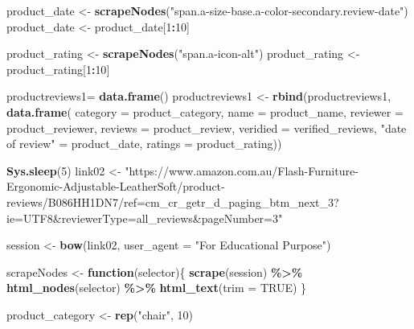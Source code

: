 \documentclass[
]{article}
\newenvironment{Shaded}{\begin{snugshade}}{\end{snugshade}}
\newcommand{\AttributeTok}[1]{\textcolor[rgb]{0.13,0.29,0.53}{#1}}
\newcommand{\ConstantTok}[1]{\textcolor[rgb]{0.56,0.35,0.01}{#1}}
\newcommand{\ControlFlowTok}[1]{\textcolor[rgb]{0.13,0.29,0.53}{\textbf{#1}}}
\newcommand{\DecValTok}[1]{\textcolor[rgb]{0.00,0.00,0.81}{#1}}
\newcommand{\FunctionTok}[1]{\textcolor[rgb]{0.13,0.29,0.53}{\textbf{#1}}}
\newcommand{\NormalTok}[1]{#1}
\newcommand{\OtherTok}[1]{\textcolor[rgb]{0.56,0.35,0.01}{#1}}
\newcommand{\SpecialCharTok}[1]{\textcolor[rgb]{0.81,0.36,0.00}{\textbf{#1}}}
\newcommand{\StringTok}[1]{\textcolor[rgb]{0.31,0.60,0.02}{#1}}
\begin{document}
\begin{Shaded}
\begin{Highlighting}[]
\NormalTok{  product\_date }\OtherTok{\textless{}{-}} \FunctionTok{scrapeNodes}\NormalTok{(}\StringTok{"span.a{-}size{-}base.a{-}color{-}secondary.review{-}date"}\NormalTok{)}
\NormalTok{  product\_date }\OtherTok{\textless{}{-}}\NormalTok{ product\_date[}\DecValTok{1}\SpecialCharTok{:}\DecValTok{10}\NormalTok{]}
  
\NormalTok{  product\_rating }\OtherTok{\textless{}{-}} \FunctionTok{scrapeNodes}\NormalTok{(}\StringTok{"span.a{-}icon{-}alt"}\NormalTok{)}
\NormalTok{  product\_rating }\OtherTok{\textless{}{-}}\NormalTok{ product\_rating[}\DecValTok{1}\SpecialCharTok{:}\DecValTok{10}\NormalTok{]}
  
\NormalTok{  productreviews1}\OtherTok{=} \FunctionTok{data.frame}\NormalTok{()}
\NormalTok{  productreviews1 }\OtherTok{\textless{}{-}} \FunctionTok{rbind}\NormalTok{(productreviews1, }\FunctionTok{data.frame}\NormalTok{(}
                      \AttributeTok{category =}\NormalTok{ product\_category,}
                      \AttributeTok{name =}\NormalTok{ product\_name,}
                      \AttributeTok{reviewer =}\NormalTok{ product\_reviewer,}
                      \AttributeTok{reviews =}\NormalTok{ product\_review,}
                      \AttributeTok{veridied =}\NormalTok{ verified\_reviews,}
                      \StringTok{"date of review"} \OtherTok{=}\NormalTok{ product\_date,}
                      \AttributeTok{ratings =}\NormalTok{ product\_rating))}

  
 \FunctionTok{Sys.sleep}\NormalTok{(}\DecValTok{5}\NormalTok{)}
\NormalTok{link02 }\OtherTok{\textless{}{-}} \StringTok{"https://www.amazon.com.au/Flash{-}Furniture{-}Ergonomic{-}Adjustable{-}LeatherSoft/product{-}reviews/B086HH1DN7/ref=cm\_cr\_getr\_d\_paging\_btm\_next\_3?ie=UTF8\&reviewerType=all\_reviews\&pageNumber=3"}


\NormalTok{  session }\OtherTok{\textless{}{-}} \FunctionTok{bow}\NormalTok{(link02,}
               \AttributeTok{user\_agent =} \StringTok{"For Educational Purpose"}\NormalTok{)}

\NormalTok{  scrapeNodes }\OtherTok{\textless{}{-}} \ControlFlowTok{function}\NormalTok{(selector)\{}
    \FunctionTok{scrape}\NormalTok{(session) }\SpecialCharTok{\%\textgreater{}\%}
      \FunctionTok{html\_nodes}\NormalTok{(selector) }\SpecialCharTok{\%\textgreater{}\%}
      \FunctionTok{html\_text}\NormalTok{(}\AttributeTok{trim =} \ConstantTok{TRUE}\NormalTok{)}
\NormalTok{  \}}

\NormalTok{  product\_category }\OtherTok{\textless{}{-}} \FunctionTok{rep}\NormalTok{(}\StringTok{"chair"}\NormalTok{, }\DecValTok{10}\NormalTok{)}


\end{Highlighting}
\end{Shaded}
\end{document}
